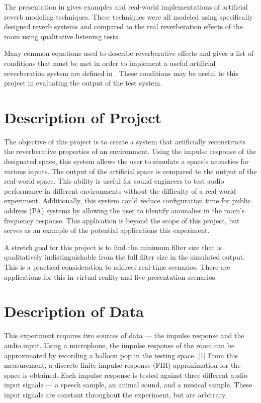 \documentclass[letterpaper, 11pt, onecolumn, oneside]{article}
\begin{document}
The presentation in \cite{parker2016artificial} gives examples
and real-world implementations of artificial reverb modeling techniques. These
techniques were all modeled using specifically designed reverb systems and
compared to the real reverberation effects of the room using qualitative
listening tests.

Many common equations used to describe reverberative effects and gives a list
of conditions that must be met in order to implement a useful artificial
reverberation system are defined in \cite{schroeder1961colorless}. These
conditions may be useful to this project in evaluating the output of the
test system.

\section*{Description of Project}
The objective of this project is to create a system that artificially
reconstructs the reverberative properties of an environment. Using the impulse
response of the designated space, this system allows the user to simulate a
space's acoustics for various inputs. The output of the artificial space is
compared to the output of the real-world space.
This ability is useful for sound engineers
to test audio performance in different environments without the difficulty of a
real-world experiment. Additionally, this system could reduce configuration
time for public address (PA) systems by allowing the user to identify anomalies
in the room’s frequency response. This application is beyond the scope of this
project, but serves as an example of the potential applications this
experiment.

A stretch goal for this project is to find the minimum filter size that is
qualitatively indistinguishable from the full filter size in the simulated
output. This is a practical consideration to address real-time scenarios. There
are applications for this in virtual reality and live presentation scenarios.

\section*{Description of Data}
This experiment requires two sources of data --- the impulse response and the
audio input. Using a microphone, the impulse response of the room can be
approximated by recording a balloon pop in the testing space. [1] From this
measurement, a discrete finite impulse response (FIR) approximation for the
space is obtained. Each impulse response is tested against three different
audio input signals --- a speech sample, an animal sound, and a musical sample.
These input signals are constant throughout the experiment, but are arbitrary.
\end{document}
